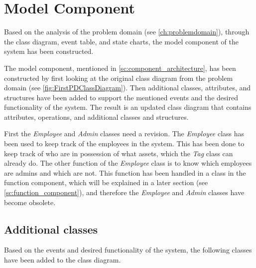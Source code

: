 \section{Model Component} \label{sc:model_component}
Based on the analysis of the problem domain (see \autoref{ch:problemdomain}), through the class diagram, event table, and state charts, the model component of the system has been constructed.
\par
The model component, mentioned in \autoref{sc:component_architecture}, has been constructed by first looking at the original class diagram from the problem domain (see \autoref{fig:FirstPDClassDiagram}). Then additional classes, attributes, and structures have been added to support the mentioned events and the desired functionality of the system. The result is an updated class diagram that contains attributes, operations, and additional classes and structures.
\par
First the \textit{Employee} and \textit{Admin} classes need a revision. The \textit{Employee} class has been used to keep track of the employees in the system. This has been done to keep track of who are in possession of what assets, which the \textit{Tag} class can already do. The other function of the \textit{Employee} class is to know which employees are admins and which are not. This function has been handled in a class in the function component, which will be explained in a later section (see \autoref{sc:function_component}), and therefore the \textit{Employee} and \textit{Admin} classes have become obsolete.

\subsection{Additional classes}
Based on the events and desired functionality of the system, the following classes have been added to the class diagram. 


